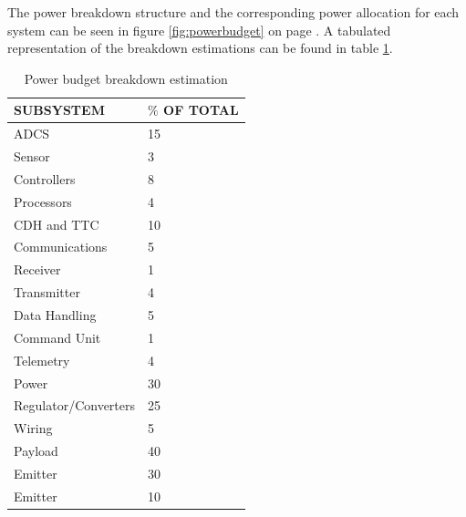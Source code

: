 The power breakdown structure and the corresponding power allocation for each system can be seen in figure \ref{fig:powerbudget} on page \pageref{fig:powerbudget}. A tabulated representation of the breakdown estimations can be found in table \ref{epsbudgettable}.

\begin{table} [h]
\centering
\begin{tabular}{p{12cm} | l }
\textbf{SUBSYSTEM} & \textbf{$\%$ OF TOTAL} \\ \hline \hline
\ac{ADCS} & 15  \\
\hspace{1.0cm} Sensor & 3 \\
\hspace{1.0cm} Controllers & 8 \\
\hspace{1.0cm} Processors & 4 \\ 
\ac{CDH} and \ac{TTC} & 10  \\
\hspace{1.0cm} Communications & 5 \\
\hspace{1.0cm} \hspace{1.0cm} Receiver & 1 \\
\hspace{1.0cm} \hspace{1.0cm} Transmitter & 4 \\
\hspace{1.0cm} Data Handling & 5 \\ 
\hspace{1.0cm} \hspace{1.0cm} Command Unit & 1 \\
\hspace{1.0cm} \hspace{1.0cm} Telemetry & 4 \\
Power & 30 \\
\hspace{1.0cm} Regulator/Converters & 25 \\
\hspace{1.0cm} Wiring & 5 \\
Payload & 40\\
\hspace{1.0cm} Emitter & 30 \\
\hspace{1.0cm} Emitter & 10 \\
\end{tabular} 
\caption{Power budget breakdown estimation}
\label{epsbudgettable}
\end{table}

